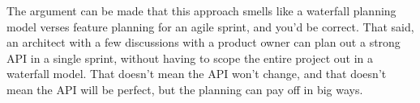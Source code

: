The argument can be made that this approach smells like a waterfall planning model verses feature planning for an agile sprint, and you'd be correct.  That said, an architect with a few discussions with a product owner can plan out a strong API in a single sprint, without having to scope the entire project out in a waterfall model.  That doesn't mean the API won't change, and that doesn't mean the API will be perfect, but the planning can pay off in big ways.
